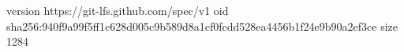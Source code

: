 version https://git-lfs.github.com/spec/v1
oid sha256:940f9a99f5ff1c628d005c9b589d8a1cf0fcdd528ea4456b1f24e9b90a2ef3ce
size 1284
